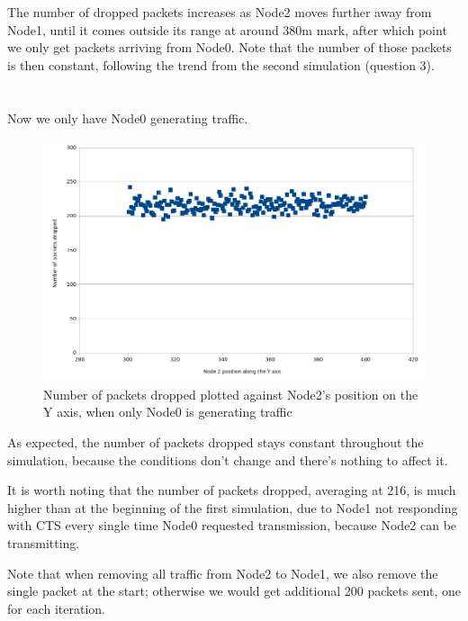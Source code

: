 \documentclass[11pt,journal]{article}
\begin{document}
	The number of dropped packets increases as Node2 moves further away from Node1, until it comes outside its range at around 380m mark, after which point we only get packets arriving from Node0. Note that the number of those packets is then constant, following the trend from the second simulation (question 3).
	\pagebreak
	\section{}
	Now we only have Node0 generating traffic.
		
	\begin{figure}[h]
		\centering
		\includegraphics[scale=0.6]{graph2.png}
		\caption{Number of packets dropped plotted against Node2's position on the Y axis, when only Node0 is generating traffic}
	\end{figure}

	As expected, the number of packets dropped stays constant throughout the simulation, because the conditions don't change and there's nothing to affect it.
	
	It is worth noting that the number of packets dropped, averaging at 216, is much higher than at the beginning of the first simulation, due to Node1 not responding with CTS every single time Node0 requested transmission, because Node2 can be transmitting.

	Note that when removing all traffic from Node2 to Node1, we also remove the single packet at the start; otherwise we would get additional 200 packets sent, one for each iteration.
	
	\pagebreak
\end{document}
